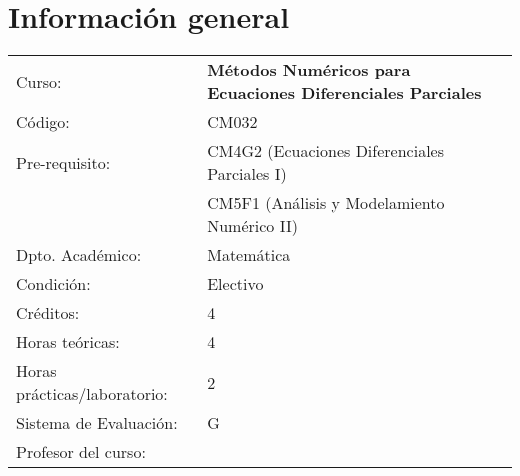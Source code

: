 \section{Información general}

\begin{table}[ht!]
    \begin{tabular}{ll}
        Curso:
         & \textbf{Métodos Numéricos para Ecuaciones Diferenciales Parciales} \\
        Código:
         & CM032                                                              \\
        Pre-requisito:
         & CM4G2 (Ecuaciones Diferenciales Parciales I)                       \\

         & CM5F1 (Análisis y Modelamiento Numérico II)                        \\
        Dpto. Académico:
         & Matemática                                                         \\
        Condición:
         & Electivo                                                           \\
        Créditos:
         & 4                                                                  \\
        Horas teóricas:
         & 4                                                                  \\
        Horas prácticas/laboratorio:
         & 2                                                                  \\
        Sistema de Evaluación:
         & G                                                                  \\
        Profesor del curso:
         &
    \end{tabular}
\end{table}